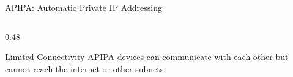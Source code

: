 \documentclass[aspectratio=169, 11pt]{beamer}
\begin{document}
\begin{frame}{APIPA: Automatic Private IP Addressing}
\begin{columns}[T]
\begin{column}{0.48\textwidth}
\begin{center}
            \end{center}
            
            \vspace{0.2em}
            \begin{exampleblock}{Limited Connectivity}
                \small
                APIPA devices can communicate with each other but cannot reach the internet or other subnets.
            \end{exampleblock}
        \end{column}
    \end{columns}
\end{frame}
\end{document}
